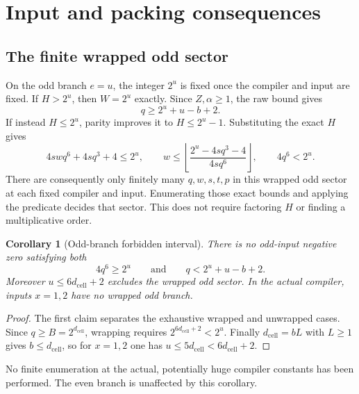 \documentclass[11pt,letterpaper]{article}
\newtheorem{corollary}[theorem]{Corollary}
\theoremstyle{definition}\newtheorem{definition}[theorem]{Definition}
\theoremstyle{remark}\newtheorem{remark}[theorem]{Remark}
\newcommand{\dcell}{d_{\mathrm{cell}}}
\begin{document}
\section{Input and packing consequences}\label{fup:nz:sec:sectors}
\subsection{The finite wrapped odd sector}
On the odd branch $e=u$, the integer $2^u$ is fixed once the compiler and input are fixed. If $H>2^u$, then $W=2^u$ exactly. Since $Z,\alpha\ge1$, the raw bound gives
\begin{equation}\label{fup:nz:eq:unwrapped}
 q\ge2^u+u-b+2.
\end{equation}
If instead $H\le2^u$, parity improves it to $H\le2^u-1$. Substituting the exact $H$ gives
\begin{equation}\label{fup:nz:eq:wrapped}
 4swq^6+4sq^3+4\le2^u,\qquad
 w\le\left\lfloor\frac{2^u-4sq^3-4}{4sq^6}\right\rfloor,
 \qquad4q^6<2^u.
\end{equation}
There are consequently only finitely many $q,w,s,t,p$ in this wrapped odd sector at each fixed compiler and input. Enumerating those exact bounds and applying the predicate decides that sector. This does not require factoring $H$ or finding a multiplicative order.

\begin{corollary}[Odd-branch forbidden interval]
There is no odd-input negative zero satisfying both
\[
 4q^6\ge2^u\qquad\text{and}\qquad q<2^u+u-b+2.
\]
Moreover $u\le6\dcell+2$ excludes the wrapped odd sector. In the actual compiler, inputs $x=1,2$ have no wrapped odd branch.
\end{corollary}
\begin{proof}
The first claim separates the exhaustive wrapped and unwrapped cases. Since $q\ge B=2^{\dcell}$, wrapping requires $2^{6\dcell+2}<2^u$. Finally $\dcell=bL$ with $L\ge1$ gives $b\le\dcell$, so for $x=1,2$ one has $u\le5\dcell<6\dcell+2$.
\end{proof}
No finite enumeration at the actual, potentially huge compiler constants has been performed. The even branch is unaffected by this corollary.
\end{document}
